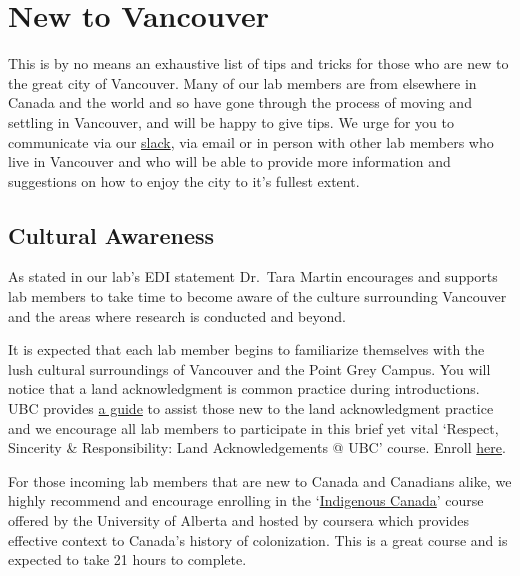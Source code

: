 \documentclass[
]{book}
\begin{document}
\hypertarget{newvancouver}{%
\chapter*{New to Vancouver}\label{newvancouver}}

This is by no means an exhaustive list of tips and tricks for those who are new to the great city of Vancouver. Many of our lab members are from elsewhere in Canada and the world and so have gone through the process of moving and settling in Vancouver, and will be happy to give tips. We urge for you to communicate via our \protect\hyperlink{slack}{slack}, via email or in person with other lab members who live in Vancouver and who will be able to provide more information and suggestions on how to enjoy the city to it's fullest extent.

\hypertarget{vancouverculture}{%
\section*{Cultural Awareness}\label{vancouverculture}}

As stated in our lab's EDI statement Dr.~Tara Martin encourages and supports lab members to take time to become aware of the culture surrounding Vancouver and the areas where research is conducted and beyond.

It is expected that each lab member begins to familiarize themselves with the lush cultural surroundings of Vancouver and the Point Grey Campus. You will notice that a land acknowledgment is common practice during introductions. UBC provides \href{https://guides.library.ubc.ca/distance-research-xwi7xwa/landacknowledgements}{a guide} to assist those new to the land acknowledgment practice and we encourage all lab members to participate in this brief yet vital `Respect, Sincerity \& Responsibility: Land Acknowledgements @ UBC' course. Enroll \href{https://wpl.ubc.ca/browse/orientation-and-onboarding/courses/wpl-oo-ilpla}{here}.

For those incoming lab members that are new to Canada and Canadians alike, we highly recommend and encourage enrolling in the `\href{https://www.coursera.org/learn/indigenous-canada}{Indigenous Canada}' course offered by the University of Alberta and hosted by coursera which provides effective context to Canada's history of colonization. This is a great course and is expected to take 21 hours to complete.
\end{document}
